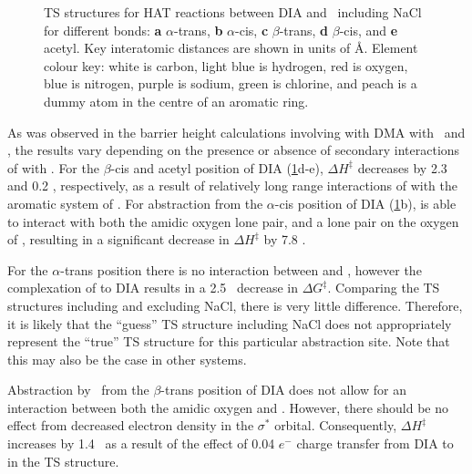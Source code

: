 \begin{figure}\ContinuedFloat
  \setcounter{subfigure}{4}

  \caption[TS structures for HAT reaction between DIA and \cumo\ including
  NaCl.]{TS structures for HAT reactions between DIA and \cumo\ including NaCl
  for different  bonds: \textbf{a} $\alpha$-trans, \textbf{b}
  $\alpha$-cis, \textbf{c} $\beta$-trans, \textbf{d} $\beta$-cis, and
  \textbf{e} acetyl. Key interatomic distances are shown in units of \AA.
  Element colour key: white is carbon, light blue is hydrogen, red is oxygen,
  blue is nitrogen, purple is sodium, green is chlorine, and peach is a dummy
  atom in the centre of an aromatic ring.}
  \label{fig:dia-cumo-ts}
\end{figure}

As was observed in the barrier height calculations involving  with DMA
with \bno\ and \cumo, the results vary depending on the presence or absence of
secondary interactions of  with \cumo. For the $\beta$-cis and acetyl
position of DIA (\ref{fig:dia-cumo-ts}d-e), $\Delta H^\ddagger$ decreases by 2.3
and 0.2 \kcalmol, respectively, as a result of relatively long range
interactions of  with the aromatic system of \cumo. For abstraction from
the $\alpha$-cis position of DIA (\ref{fig:dia-cumo-ts}b),  is able to
interact with both the amidic oxygen lone pair, and a lone pair on the oxygen of
\cumo, resulting in a significant decrease in $\Delta H^\ddagger$ by 7.8
\kcalmol.

For the $\alpha$-trans position there is no interaction between  and
\cumo, however the complexation of  to DIA results in a 2.5 \kcalmol\
decrease in $\Delta G^\ddagger$. Comparing the TS structures including and
excluding NaCl, there is very little difference. Therefore, it is likely that
the ``guess'' TS structure including NaCl does not appropriately represent the
``true'' TS structure for this particular abstraction site. Note that this may
also be the case in other systems.

Abstraction by \cumo\ from the $\beta$-trans position of DIA does not allow for
an interaction between both the amidic oxygen and \cumo. However, there should
be no effect from decreased electron density in the \ch{C-H} $\sigma^*$ orbital.
Consequently, $\Delta H^\ddagger$ increases by 1.4 \kcalmol\ as a result of the
effect of 0.04 $e^-$ charge transfer from DIA to \ch{Na} in the TS structure.


